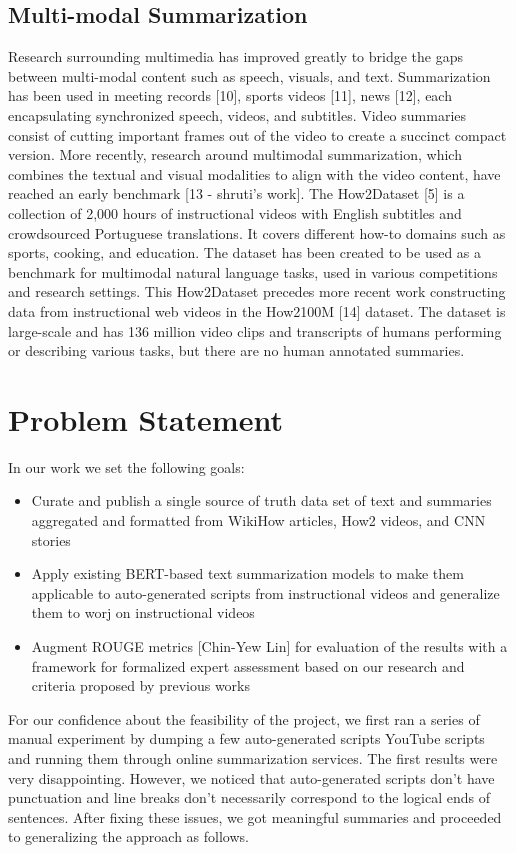 \documentclass{article}
\begin{document}
\subsection{Multi-modal Summarization}
Research surrounding multimedia has improved greatly to bridge the gaps between multi-modal 
content such as speech, visuals, and text. Summarization has been used in meeting records [10], sports videos [11], news [12], each encapsulating synchronized speech, videos, and subtitles. Video summaries consist of cutting important frames out of the video to create a succinct compact version. More recently, research around multimodal summarization, which combines the textual and visual modalities to align with the video content, have reached an early benchmark [13 - shruti’s work]. The How2Dataset [5] is a  collection of 2,000 hours of instructional videos with English subtitles and crowdsourced Portuguese translations. It covers different how-to domains such as sports, cooking, and education. The dataset has been created to be used as a benchmark for multimodal natural language tasks, used in various competitions and research settings. This How2Dataset precedes more recent work constructing data from instructional web videos in the How2100M [14] dataset. The dataset is large-scale and has 136 million video clips and transcripts of humans performing or describing various tasks, but there are no human annotated summaries. 

\section{Problem Statement}

In our work we set the following goals:
\begin{itemize}

\item Curate and publish a single source of truth data set of text and summaries aggregated and formatted from WikiHow articles, How2 videos, and CNN stories
\item Apply existing BERT-based text summarization models to make them applicable to auto-generated scripts from instructional videos and generalize them to worj on instructional videos
\item Augment ROUGE metrics [Chin-Yew Lin] for evaluation of the results with a framework for formalized expert assessment based on our research and criteria proposed by previous works 
\end{itemize}

For our confidence about the feasibility of the project, we first ran a series of manual experiment by dumping a few auto-generated scripts YouTube scripts and running them through online summarization services. The first results were very disappointing. However, we noticed that auto-generated scripts don't have punctuation and line breaks don't necessarily correspond to the logical ends of sentences. After fixing these issues, we got meaningful summaries and proceeded to generalizing the approach as follows.
 
\end{document}
